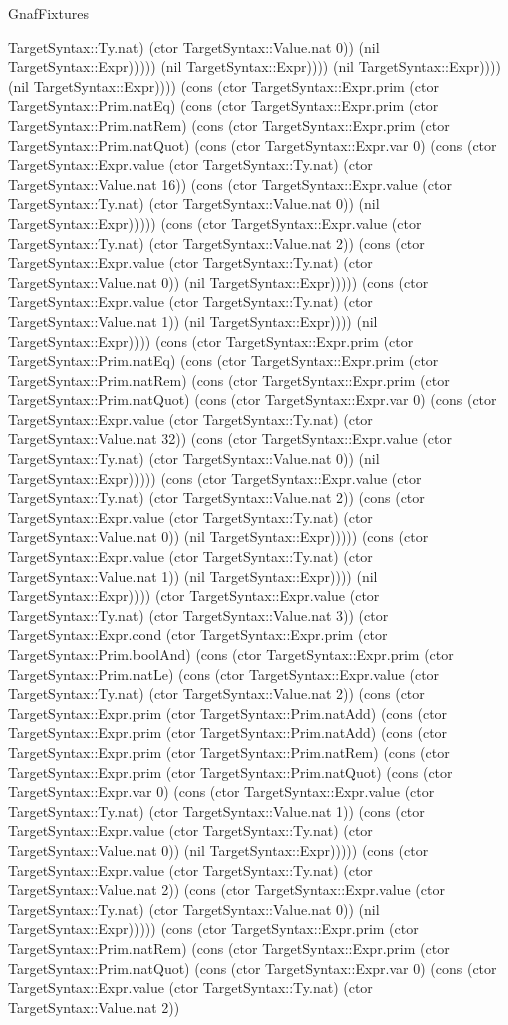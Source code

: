 \begin{lexlean}{GnafFixtures}
\begin{semanticmodule}
{TargetSyntax::Ty.nat) (ctor TargetSyntax::Value.nat 0)) (nil TargetSyntax::Expr))))) (nil TargetSyntax::Expr)))) (nil TargetSyntax::Expr)))) (nil TargetSyntax::Expr)))) (cons (ctor TargetSyntax::Expr.prim (ctor TargetSyntax::Prim.natEq) (cons (ctor TargetSyntax::Expr.prim (ctor TargetSyntax::Prim.natRem) (cons (ctor TargetSyntax::Expr.prim (ctor TargetSyntax::Prim.natQuot) (cons (ctor TargetSyntax::Expr.var 0) (cons (ctor TargetSyntax::Expr.value (ctor TargetSyntax::Ty.nat) (ctor TargetSyntax::Value.nat 16)) (cons (ctor TargetSyntax::Expr.value (ctor TargetSyntax::Ty.nat) (ctor TargetSyntax::Value.nat 0)) (nil TargetSyntax::Expr))))) (cons (ctor TargetSyntax::Expr.value (ctor TargetSyntax::Ty.nat) (ctor TargetSyntax::Value.nat 2)) (cons (ctor TargetSyntax::Expr.value (ctor TargetSyntax::Ty.nat) (ctor TargetSyntax::Value.nat 0)) (nil TargetSyntax::Expr))))) (cons (ctor TargetSyntax::Expr.value (ctor TargetSyntax::Ty.nat) (ctor TargetSyntax::Value.nat 1)) (nil TargetSyntax::Expr)))) (nil TargetSyntax::Expr)))) (cons (ctor TargetSyntax::Expr.prim (ctor TargetSyntax::Prim.natEq) (cons (ctor TargetSyntax::Expr.prim (ctor TargetSyntax::Prim.natRem) (cons (ctor TargetSyntax::Expr.prim (ctor TargetSyntax::Prim.natQuot) (cons (ctor TargetSyntax::Expr.var 0) (cons (ctor TargetSyntax::Expr.value (ctor TargetSyntax::Ty.nat) (ctor TargetSyntax::Value.nat 32)) (cons (ctor TargetSyntax::Expr.value (ctor TargetSyntax::Ty.nat) (ctor TargetSyntax::Value.nat 0)) (nil TargetSyntax::Expr))))) (cons (ctor TargetSyntax::Expr.value (ctor TargetSyntax::Ty.nat) (ctor TargetSyntax::Value.nat 2)) (cons (ctor TargetSyntax::Expr.value (ctor TargetSyntax::Ty.nat) (ctor TargetSyntax::Value.nat 0)) (nil TargetSyntax::Expr))))) (cons (ctor TargetSyntax::Expr.value (ctor TargetSyntax::Ty.nat) (ctor TargetSyntax::Value.nat 1)) (nil TargetSyntax::Expr)))) (nil TargetSyntax::Expr)))) (ctor TargetSyntax::Expr.value (ctor TargetSyntax::Ty.nat) (ctor TargetSyntax::Value.nat 3)) (ctor TargetSyntax::Expr.cond (ctor TargetSyntax::Expr.prim (ctor TargetSyntax::Prim.boolAnd) (cons (ctor TargetSyntax::Expr.prim (ctor TargetSyntax::Prim.natLe) (cons (ctor TargetSyntax::Expr.value (ctor TargetSyntax::Ty.nat) (ctor TargetSyntax::Value.nat 2)) (cons (ctor TargetSyntax::Expr.prim (ctor TargetSyntax::Prim.natAdd) (cons (ctor TargetSyntax::Expr.prim (ctor TargetSyntax::Prim.natAdd) (cons (ctor TargetSyntax::Expr.prim (ctor TargetSyntax::Prim.natRem) (cons (ctor TargetSyntax::Expr.prim (ctor TargetSyntax::Prim.natQuot) (cons (ctor TargetSyntax::Expr.var 0) (cons (ctor TargetSyntax::Expr.value (ctor TargetSyntax::Ty.nat) (ctor TargetSyntax::Value.nat 1)) (cons (ctor TargetSyntax::Expr.value (ctor TargetSyntax::Ty.nat) (ctor TargetSyntax::Value.nat 0)) (nil TargetSyntax::Expr))))) (cons (ctor TargetSyntax::Expr.value (ctor TargetSyntax::Ty.nat) (ctor TargetSyntax::Value.nat 2)) (cons (ctor TargetSyntax::Expr.value (ctor TargetSyntax::Ty.nat) (ctor TargetSyntax::Value.nat 0)) (nil TargetSyntax::Expr))))) (cons (ctor TargetSyntax::Expr.prim (ctor TargetSyntax::Prim.natRem) (cons (ctor TargetSyntax::Expr.prim (ctor TargetSyntax::Prim.natQuot) (cons (ctor TargetSyntax::Expr.var 0) (cons (ctor TargetSyntax::Expr.value (ctor TargetSyntax::Ty.nat) (ctor TargetSyntax::Value.nat 2)) }
\end{semanticmodule}
\end{lexlean}
